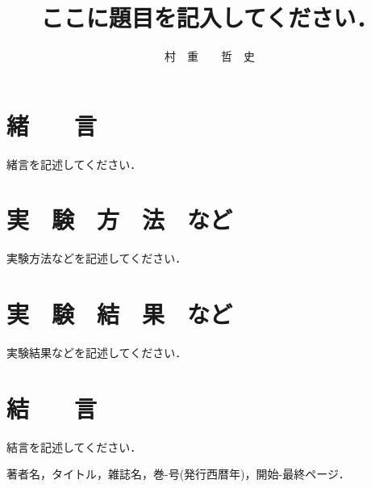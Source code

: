 \documentclass{advanced}
\title{ここに題目を記入してください．}
\author{村　重　　哲　史}
\begin{document}
\maketitle

\section{緒　　言}

緒言を記述してください．

\section{実　験　方　法　など}

実験方法などを記述してください．

\section{実　験　結　果　など}

実験結果などを記述してください．

\section{結　　言}

結言を記述してください．

\begin{thebibliography}{99}
	著者名，タイトル，雑誌名，巻-号(発行西暦年)，開始-最終ページ．
\end{thebibliography}
\end{document}
